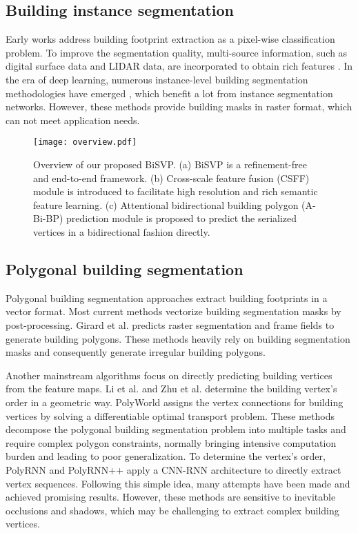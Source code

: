 \documentclass{article}
\begin{document}
\subsection{Building instance segmentation}
Early works address building footprint extraction as a pixel-wise classification problem. To improve the segmentation quality, multi-source information, such as digital surface data and LIDAR data, are incorporated to obtain rich features \cite{awrangjeb2010automatic,li2018semantic}. In the era of deep learning, numerous instance-level building segmentation methodologies have emerged \cite{li2018hough,zhao2018building,zorzi2019regularization,xu2021gated}, which benefit a lot from instance segmentation networks. However, these methods provide building masks in raster format, which can not meet application needs.
\begin{figure*}[htb]
\centering
\texttt{[image: overview.pdf]}
\caption{Overview of our proposed BiSVP. (a) BiSVP is a refinement-free and end-to-end framework. (b) Cross-scale feature fusion (CSFF) module is introduced to facilitate high resolution and rich semantic feature learning. (c) Attentional bidirectional building polygon (A-Bi-BP) prediction module is proposed to predict the serialized vertices in a bidirectional fashion directly.}
\label{Fig2}
\end{figure*}
\vspace{-10pt}
\subsection{Polygonal building segmentation}
Polygonal building segmentation approaches extract building footprints in a vector format. Most current methods \cite{chen2020polygoncnn,liang2020polytransform,li2020approximating,zorzi2021machine,chen2021quantization} vectorize building segmentation masks by post-processing. Girard et al. \cite{girard2021framefield} predicts raster segmentation and frame fields to generate building polygons. These methods heavily rely on building segmentation masks and consequently generate irregular building polygons.

Another mainstream algorithms focus on directly predicting building vertices from the feature maps. Li et al. \cite{li2020instance} and Zhu et al. \cite{zhu2021apga} determine the building vertex's order in a geometric way. PolyWorld \cite{zorzi2021polyworld} assigns the vertex connections for building vertices by solving a differentiable optimal transport problem. These methods decompose the polygonal building segmentation problem into multiple tasks and require complex polygon constraints, normally bringing intensive computation burden and leading to poor generalization. To determine the vertex's order, PolyRNN \cite{castrejon2017polygonrnn} and PolyRNN++ \cite{acuna2018polygonrnn++} apply a CNN-RNN architecture to directly extract vertex sequences. Following this simple idea, many attempts \cite{li2019polymapper,zhao2021building} have been made and achieved promising results. However, these methods are sensitive to inevitable occlusions and shadows, which may be challenging to extract complex building vertices.
\end{document}
